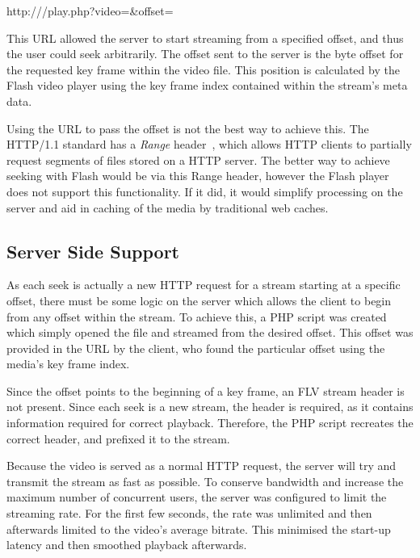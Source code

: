     \begin{center}
    http:///play.php?video=\&offset=
    \end{center}

    This URL allowed the server to start streaming from a specified offset, and thus the user could seek arbitrarily. The offset sent to the server is the byte offset for the requested key frame within the video file. This position is calculated by the Flash video player using the key frame index contained within the stream's meta data.

    Using the URL to pass the offset is not the best way to achieve this. The HTTP/1.1 standard has a \emph{Range} header~\cite{rfc2616}, which allows HTTP clients to partially request segments of files stored on a HTTP server. The better way to achieve seeking with Flash would be via this Range header, however the Flash player does not support this functionality. If it did, it would simplify processing on the server and aid in caching of the media by traditional web caches.

\subsection{Server Side Support}

    As each seek is actually a new HTTP request for a stream starting at a specific offset, there must be some logic on the server which allows the client to begin from any offset within the stream. To achieve this, a PHP script was created which simply opened the file and streamed from the desired offset. This offset was provided in the URL by the client, who found the particular offset using the media's key frame index.

    Since the offset points to the beginning of a key frame, an FLV stream header is not present. Since each seek is a new stream, the header is required, as it contains information required for correct playback. Therefore, the PHP script recreates the correct header, and prefixed it to the stream.

    Because the video is served as a normal HTTP request, the server will try and transmit the stream as fast as possible. To conserve bandwidth and increase the maximum number of concurrent users, the server was configured to limit the streaming rate. For the first few seconds, the rate was unlimited and then afterwards limited to the video's average bitrate. This minimised the start-up latency and then smoothed playback afterwards.

